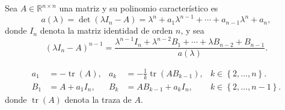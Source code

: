 \begin{frame}
	Sea $A\in\mathbb{R}^{n\times n}$ una matriz y su polinomio
	característico es
	\begin{equation*}
		a\left(\lambda\right)=
		\det\left(\lambda I_{n}-A\right)=
		\lambda^{n}+a_{1}\lambda^{n-1}+\cdots+
		a_{n-1}\lambda^{n}+a_{n},
	\end{equation*}
	donde $I_{n}$ denota la matriz identidad de orden $n$, y sea
	\begin{equation*}
		{\left(\lambda I_{n}-A\right)}^{n-1}=
		\dfrac{
		\lambda^{n-1}I_{n}+
		\lambda^{n-2}B_{1}+
		\cdots+
		\lambda B_{n-2}+
		B_{n-1}
		}{a\left(\lambda\right)}.
	\end{equation*}

	\begin{align*}
		a_{1} & =-\operatorname{tr}\left(A\right),                   &
		a_{k} & =-\frac{1}{k}\operatorname{tr}\left(AB_{k-1}\right),
		      & k\in\left\{2,\dotsc,n\right\}.                         \\
		B_{1} & = A + a_{1}I_{n},                                    &
		B_{k} & =AB_{k-1}+a_{k}I_{n},
		      & k\in\left\{2,\dotsc,n-1\right\}.
	\end{align*}
	donde $\operatorname{tr}\left(A\right)$ denota la traza de $A$.
\end{frame}

